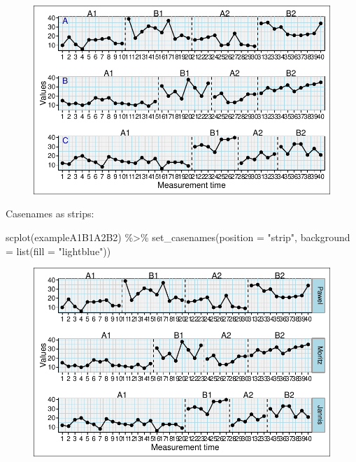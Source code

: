 \documentclass[
  letterpaper,
  DIV=11,
  numbers=noendperiod]{scrreprt}
\newenvironment{Shaded}{\begin{snugshade}}{\end{snugshade}}
\newcommand{\AttributeTok}[1]{\textcolor[rgb]{0.40,0.45,0.13}{#1}}
\newcommand{\FunctionTok}[1]{\textcolor[rgb]{0.28,0.35,0.67}{#1}}
\newcommand{\NormalTok}[1]{\textcolor[rgb]{0.00,0.23,0.31}{#1}}
\newcommand{\SpecialCharTok}[1]{\textcolor[rgb]{0.37,0.37,0.37}{#1}}
\newcommand{\StringTok}[1]{\textcolor[rgb]{0.13,0.47,0.30}{#1}}
\begin{document}
\begin{figure}[H]

{\centering \includegraphics{./ch_scplot_files/figure-pdf/casenames1-1.pdf}

}

\end{figure}

Casenames as strips:

\begin{Shaded}
\begin{Highlighting}[]
\FunctionTok{scplot}\NormalTok{(exampleA1B1A2B2) }\SpecialCharTok{\%\textgreater{}\%}
  \FunctionTok{set\_casenames}\NormalTok{(}\AttributeTok{position =} \StringTok{"strip"}\NormalTok{, }
                \AttributeTok{background =} \FunctionTok{list}\NormalTok{(}\AttributeTok{fill =} \StringTok{"lightblue"}\NormalTok{))}
\end{Highlighting}
\end{Shaded}

\begin{figure}[H]

{\centering \includegraphics{./ch_scplot_files/figure-pdf/casenames2-1.pdf}

}

\end{figure}
\end{document}

